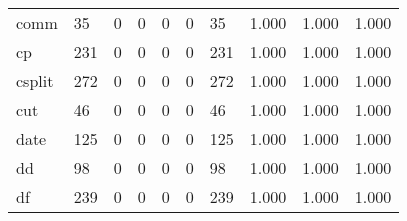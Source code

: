 \begin{longtable}{lp{1.3cm}p{1.3cm}p{1.3cm}p{1.3cm}p{1.3cm}p{1.3cm}p{1.3cm}p{1.3cm}p{1.3cm}}
comm      &                     35 &                                             0 &                                            0 &                                           0 &                                            0 &                                         35 &                                1.000 &                                  1.000 &                                1.000 \\
cp        &                    231 &                                             0 &                                            0 &                                           0 &                                            0 &                                        231 &                                1.000 &                                  1.000 &                                1.000 \\
csplit    &                    272 &                                             0 &                                            0 &                                           0 &                                            0 &                                        272 &                                1.000 &                                  1.000 &                                1.000 \\
cut       &                     46 &                                             0 &                                            0 &                                           0 &                                            0 &                                         46 &                                1.000 &                                  1.000 &                                1.000 \\
date      &                    125 &                                             0 &                                            0 &                                           0 &                                            0 &                                        125 &                                1.000 &                                  1.000 &                                1.000 \\
dd        &                     98 &                                             0 &                                            0 &                                           0 &                                            0 &                                         98 &                                1.000 &                                  1.000 &                                1.000 \\
df        &                    239 &                                             0 &                                            0 &                                           0 &                                            0 &                                        239 &                                1.000 &                                  1.000 &                                1.000 \\

\end{longtable}
